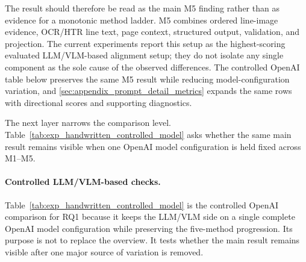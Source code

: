 The result should therefore be read as the main M5 finding rather than as evidence for a monotonic method ladder. M5 combines ordered line-image evidence, OCR/HTR line text, page context, structured output, validation, and projection. The current experiments report this setup as the highest-scoring evaluated LLM/VLM-based alignment setup; they do not isolate any single component as the sole cause of the observed differences. The controlled OpenAI table below preserves the same M5 result while reducing model-configuration variation, and \autoref{sec:appendix_prompt_detail_metrics} expands the same rows with directional scores and supporting diagnostics.

The next layer narrows the comparison level. Table~\ref{tab:exp_handwritten_controlled_model} asks whether the same main result remains visible when one OpenAI model configuration is held fixed across M1--M5.

\paragraph{Controlled LLM/VLM-based checks.}
\label{sec:experimentation_controlled_checks}

Table~\ref{tab:exp_handwritten_controlled_model} is the controlled OpenAI comparison for RQ1 because it keeps the LLM/VLM side on a single complete OpenAI model configuration while preserving the five-method progression. Its purpose is not to replace the overview. It tests whether the main result remains visible after one major source of variation is removed.

